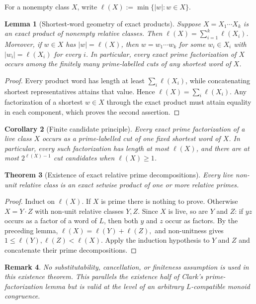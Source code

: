 \documentclass[11pt,a4paper]{article}
\newtheorem{theorem}{Theorem}[section]
\newtheorem{lemma}[theorem]{Lemma}
\newtheorem{corollary}[theorem]{Corollary}
\newtheorem{remark}[theorem]{Remark}
\begin{document}
For a nonempty class $X$, write
\(\ell(X):=\min\{|w|:w\in X\}.\)

\begin{lemma}[Shortest-word geometry of exact products]
\label{lem:shortest-word-cut}
Suppose $X=X_1\cdots X_k$ is an exact product of nonempty relative
classes.  Then $\ell(X)=\sum_{i=1}^k\ell(X_i)$.  Moreover, if
$w\in X$ has $|w|=\ell(X)$, then
$w=w_1\cdots w_k$ for some $w_i\in X_i$ with
$|w_i|=\ell(X_i)$ for every $i$.  In particular, every exact prime
factorization of $X$ occurs among the finitely many prime-labelled cuts
of any shortest word of $X$.
\end{lemma}

\begin{proof}
Every product word has length at least $\sum_i\ell(X_i)$, while
concatenating shortest representatives attains that value.  Hence
$\ell(X)=\sum_i\ell(X_i)$.  Any factorization of a shortest $w\in X$
through the exact product must attain equality in each component,
which proves the second assertion.
\end{proof}

\begin{corollary}[Finite candidate principle]
\label{cor:finite-candidates}
Every exact prime factorization of a live class $X$ occurs as a prime-labelled cut of one fixed shortest word of $X$.  In particular, every such factorization has length at most $\ell(X)$, and there are at most $2^{\ell(X)-1}$ cut candidates when $\ell(X)\ge1$.
\end{corollary}

\begin{theorem}[Existence of exact relative prime decompositions]
\label{thm:prime-existence}
Every live non-unit relative class is an exact setwise product of one or more relative primes.
\end{theorem}

\begin{proof}
Induct on $\ell(X)$.  If $X$ is prime there is nothing to prove.  Otherwise $X=Y\cdot Z$ with non-unit relative classes $Y,Z$.  Since $X$ is live, so are $Y$ and $Z$: if $yz$ occurs as a factor of a word of $L$, then both $y$ and $z$ occur as factors.  By the preceding lemma,
\(\ell(X)=\ell(Y)+\ell(Z),\)
and non-unitness gives $1\le\ell(Y),\ell(Z)<\ell(X)$.  Apply the induction hypothesis to $Y$ and $Z$ and concatenate their prime decompositions.
\end{proof}

\begin{remark}
No substitutability, cancellation, or finiteness assumption is used in this existence theorem.  This parallels the existence half of Clark's prime-factorization lemma but is valid at the level of an arbitrary $L$-compatible monoid congruence.
\end{remark}
\end{document}
